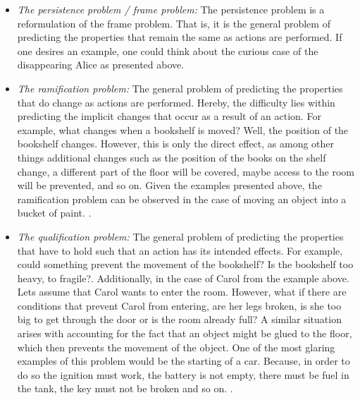 \documentclass{article}
\begin{document}
\begin{itemize}
\item \emph{The persistence problem / frame problem: } The persistence problem is a reformulation of the frame problem. That is, it is the general problem of predicting the properties that remain the same as actions are performed. If one desires an example, one could think about the curious case of the disappearing Alice as presented above. \cite{BOCHMAN2007557}

\item \emph{The ramification problem: }  The general problem of predicting the properties that do change as actions are performed. Hereby, the difficulty lies within predicting the implicit changes that occur as a result of an action. For example, what changes when a bookshelf is moved? Well, the position of the bookshelf changes. However, this is only the direct effect, as among other things additional changes such as the position of the books on the shelf change, a different part of the floor will be covered, maybe access to the room will be prevented, and so on. Given the examples presented above, the ramification problem can be observed in the case of moving an object into a bucket of paint. \cite{ginsberg1987reasoning}.

\item \emph{The qualification problem: }  The general problem of predicting the properties that have to hold such that an action has its intended effects. For example, could something prevent the movement of the bookshelf? Is the bookshelf too heavy, to fragile?. Additionally, in the case of Carol from the example above. Lets assume that Carol wants to enter the room. However, what if there are conditions that prevent Carol from entering, are her legs broken, is she too big to get through the door or is the room already full? A similar situation arises with accounting for the fact that an object might be glued to the floor, which then prevents the movement of the object. One of the most glaring examples of this problem would be the starting of a car. Because, in order to do so the ignition must work, the battery is not empty, there must be fuel in the tank, the key must not be broken and so on. 
 \cite{ginsberg1987reasoning,BOCHMAN2007557}.
\end{itemize}
\end{document}
